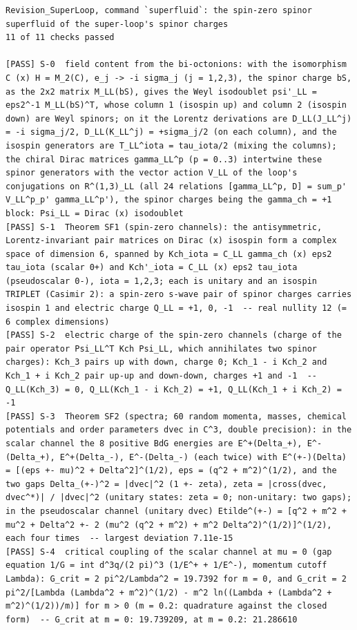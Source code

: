 \documentclass[
  10pt,
]{article}
\begin{document}
\begin{verbatim}
Revision_SuperLoop, command `superfluid`: the spin-zero spinor superfluid of the super-loop's spinor charges
11 of 11 checks passed

[PASS] S-0  field content from the bi-octonions: with the isomorphism C (x) H = M_2(C), e_j -> -i sigma_j (j = 1,2,3), the spinor charge bS, as the 2x2 matrix M_LL(bS), gives the Weyl isodoublet psi'_LL = eps2^-1 M_LL(bS)^T, whose column 1 (isospin up) and column 2 (isospin down) are Weyl spinors; on it the Lorentz derivations are D_LL(J_LL^j) = -i sigma_j/2, D_LL(K_LL^j) = +sigma_j/2 (on each column), and the isospin generators are T_LL^iota = tau_iota/2 (mixing the columns); the chiral Dirac matrices gamma_LL^p (p = 0..3) intertwine these spinor generators with the vector action V_LL of the loop's conjugations on R^(1,3)_LL (all 24 relations [gamma_LL^p, D] = sum_p' V_LL^p_p' gamma_LL^p'), the spinor charges being the gamma_ch = +1 block: Psi_LL = Dirac (x) isodoublet
[PASS] S-1  Theorem SF1 (spin-zero channels): the antisymmetric, Lorentz-invariant pair matrices on Dirac (x) isospin form a complex space of dimension 6, spanned by Kch_iota = C_LL gamma_ch (x) eps2 tau_iota (scalar 0+) and Kch'_iota = C_LL (x) eps2 tau_iota (pseudoscalar 0-), iota = 1,2,3; each is unitary and an isospin TRIPLET (Casimir 2): a spin-zero s-wave pair of spinor charges carries isospin 1 and electric charge Q_LL = +1, 0, -1  -- real nullity 12 (= 6 complex dimensions)
[PASS] S-2  electric charge of the spin-zero channels (charge of the pair operator Psi_LL^T Kch Psi_LL, which annihilates two spinor charges): Kch_3 pairs up with down, charge 0; Kch_1 - i Kch_2 and Kch_1 + i Kch_2 pair up-up and down-down, charges +1 and -1  -- Q_LL(Kch_3) = 0, Q_LL(Kch_1 - i Kch_2) = +1, Q_LL(Kch_1 + i Kch_2) = -1
[PASS] S-3  Theorem SF2 (spectra; 60 random momenta, masses, chemical potentials and order parameters dvec in C^3, double precision): in the scalar channel the 8 positive BdG energies are E^+(Delta_+), E^-(Delta_+), E^+(Delta_-), E^-(Delta_-) (each twice) with E^(+-)(Delta) = [(eps +- mu)^2 + Delta^2]^(1/2), eps = (q^2 + m^2)^(1/2), and the two gaps Delta_(+-)^2 = |dvec|^2 (1 +- zeta), zeta = |cross(dvec, dvec^*)| / |dvec|^2 (unitary states: zeta = 0; non-unitary: two gaps); in the pseudoscalar channel (unitary dvec) Etilde^(+-) = [q^2 + m^2 + mu^2 + Delta^2 +- 2 (mu^2 (q^2 + m^2) + m^2 Delta^2)^(1/2)]^(1/2), each four times  -- largest deviation 7.11e-15
[PASS] S-4  critical coupling of the scalar channel at mu = 0 (gap equation 1/G = int d^3q/(2 pi)^3 (1/E^+ + 1/E^-), momentum cutoff Lambda): G_crit = 2 pi^2/Lambda^2 = 19.7392 for m = 0, and G_crit = 2 pi^2/[Lambda (Lambda^2 + m^2)^(1/2) - m^2 ln((Lambda + (Lambda^2 + m^2)^(1/2))/m)] for m > 0 (m = 0.2: quadrature against the closed form)  -- G_crit at m = 0: 19.739209, at m = 0.2: 21.286610

\end{verbatim}
\end{document}
